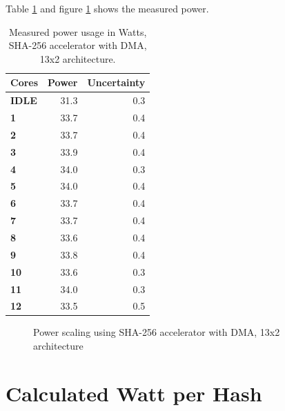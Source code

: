 \begin{appendix}
Table \ref{tab:SHADMA-power2} and figure \ref{fig:SHADMA-power2} shows the measured power.

\begin{table}
\begin{tabular}{| l | r | r |}
  \hline 
  \textbf{Cores} & \textbf{Power} & \textbf{Uncertainty} \\
  \hline                       
  \textbf{IDLE} &  31.3 & 0.3 \\
  \textbf{1} &  33.7 & 0.4\\
  \textbf{2} &  33.7 & 0.4\\
  \textbf{3} &  33.9 & 0.4\\
  \textbf{4} &  34.0 & 0.3\\
  \textbf{5} &  34.0 & 0.4\\
  \textbf{6} &  33.7 & 0.4\\
  \textbf{7} &  33.7 & 0.4\\
  \textbf{8} &  33.6 & 0.4\\
  \textbf{9} &  33.8 & 0.4\\
  \textbf{10} &  33.6 & 0.3\\
  \textbf{11} &  34.0 & 0.3\\
  \textbf{12} &  33.5 & 0.5 \\
  \hline 
\end{tabular}
\caption{Measured power usage in Watts, SHA-256 accelerator with DMA, 13x2 architecture.}
\label{tab:SHADMA-power2}
\end{table}

\begin{figure}
	\caption{Power scaling using SHA-256 accelerator  with DMA, 13x2 architecture}
	\label{fig:SHADMA-power2}
\end{figure}

\chapter{Calculated Watt per Hash}




\end{appendix}

